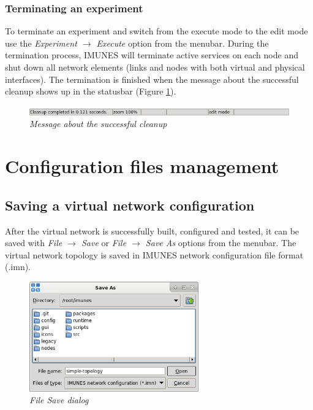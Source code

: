 \subsubsection{Terminating an experiment}
To terminate an experiment and switch from the execute mode to the edit mode
use the \emph{Experiment $\to$ Execute} option from the menubar. During the
termination process, IMUNES will terminate active services on each node and
shut down all network elements (links and nodes with both virtual and physical
interfaces). The termination is finished when the message about the successful
cleanup shows up in the statusbar (Figure \ref{fig:statusbar4}).

\begin{figure}[H]
\centering
\vspace{10pt}
\includegraphics[width=\textwidth]{./images/statusbar4.png}
\caption{\emph{Message about the successful cleanup}}
\label{fig:statusbar4}
\end{figure}

\section{Configuration files management}

\subsection{Saving a virtual network configuration}

After the virtual network is successfully built, configured and tested, it can
be saved with \emph{File $\to$ Save} or \emph{File $\to$ Save As} options from
the menubar. The virtual network topology is saved in IMUNES network
configuration file format (.imn).

\begin{figure}[H]
\centering
\vspace{10pt}
\includegraphics[width=0.65\textwidth]{./images/file_save.png}
\caption{\emph{File Save dialog}}
\label{fig:file_save}
\end{figure}

